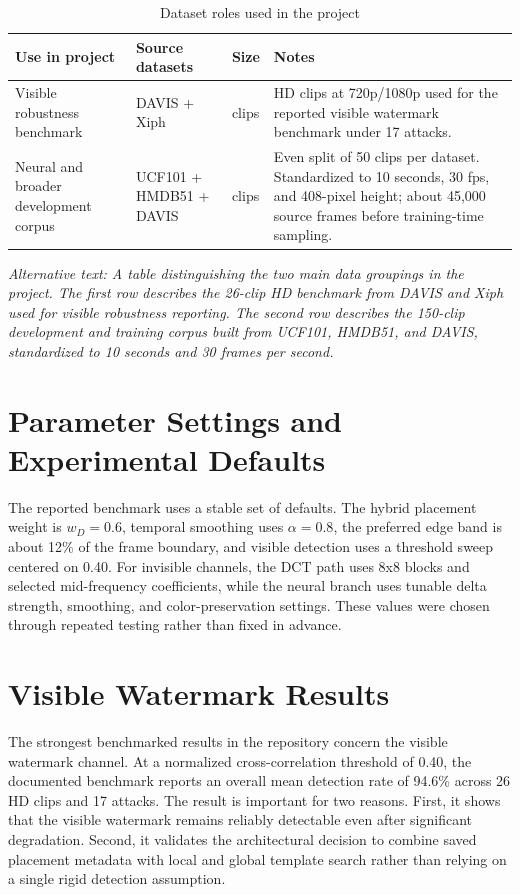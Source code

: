 \documentclass[12pt,oneside]{report}
\newcommand{\AltText}[1]{\par\small\textit{Alternative text: #1}\normalsize}
\begin{document}
\begin{table}[htbp]
\centering
\caption{Dataset roles used in the project}
{\small
\begin{tabularx}{0.96\textwidth}{>{\raggedright\arraybackslash}p{1.6in} >{\raggedright\arraybackslash}p{1.45in} >{\raggedright\arraybackslash}p{0.75in} X}
\toprule
Use in project & Source datasets & Size & Notes \\
\midrule
Visible robustness benchmark & DAVIS + Xiph & 26 clips & HD clips at 720p/1080p used for the reported visible watermark benchmark under 17 attacks. \\
Neural and broader development corpus & UCF101 + HMDB51 + DAVIS & 150 clips & Even split of 50 clips per dataset. Standardized to 10 seconds, 30 fps, and 408-pixel height; about 45{,}000 source frames before training-time sampling. \\
\bottomrule
\end{tabularx}
}
\AltText{A table distinguishing the two main data groupings in the project. The first row describes the 26-clip HD benchmark from DAVIS and Xiph used for visible robustness reporting. The second row describes the 150-clip development and training corpus built from UCF101, HMDB51, and DAVIS, standardized to 10 seconds and 30 frames per second.}
\end{table}

\section{Parameter Settings and Experimental Defaults}
The reported benchmark uses a stable set of defaults. The hybrid placement weight is $w_D = 0.6$, temporal smoothing uses $\alpha = 0.8$, the preferred edge band is about 12\% of the frame boundary, and visible detection uses a threshold sweep centered on 0.40. For invisible channels, the DCT path uses 8x8 blocks and selected mid-frequency coefficients, while the neural branch uses tunable delta strength, smoothing, and color-preservation settings. These values were chosen through repeated testing rather than fixed in advance.

\section{Visible Watermark Results}
The strongest benchmarked results in the repository concern the visible watermark channel. At a normalized cross-correlation threshold of 0.40, the documented benchmark reports an overall mean detection rate of 94.6\% across 26 HD clips and 17 attacks. The result is important for two reasons. First, it shows that the visible watermark remains reliably detectable even after significant degradation. Second, it validates the architectural decision to combine saved placement metadata with local and global template search rather than relying on a single rigid detection assumption.
\end{document}
